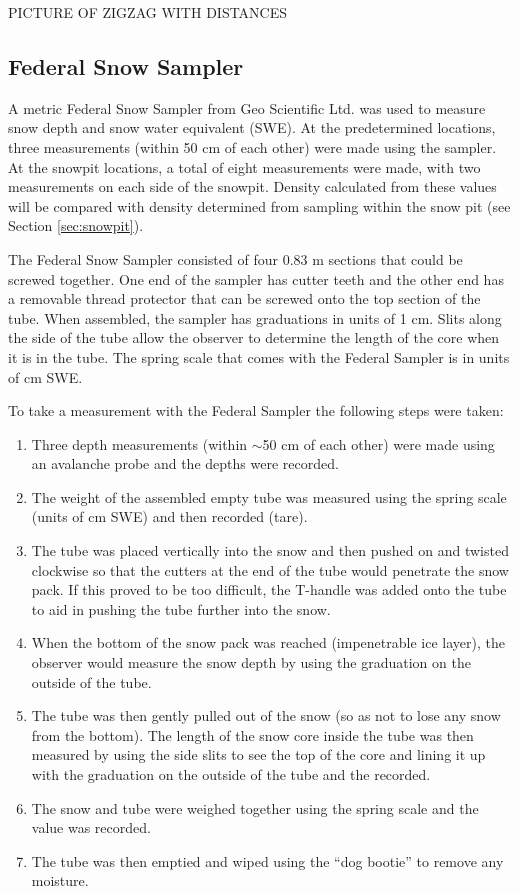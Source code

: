 \documentclass[12pt]{article}
\begin{document}
 PICTURE OF ZIGZAG WITH DISTANCES
 
 \subsection{Federal Snow Sampler}
\label{sec:SWE}
 
A metric Federal Snow Sampler from Geo Scientific Ltd. was used to measure snow depth and snow water equivalent (SWE). At the predetermined locations, three measurements (within 50 cm of each other) were made using the sampler. At the snowpit locations, a total of eight measurements were made, with two measurements on each side of the snowpit. Density calculated from these values will be compared with density determined from sampling within the snow pit (see Section \ref{sec:snowpit}). 

The Federal Snow Sampler consisted of four 0.83 m sections that could be screwed together. One end of the sampler has cutter teeth and the other end has a removable thread protector that can be screwed onto the top section of the tube. When assembled, the sampler has graduations in units of 1 cm. Slits along the side of the tube allow the observer to determine the length of the core when it is in the tube. The spring scale that comes with the Federal Sampler is in units of cm SWE.  

To take a measurement with the Federal Sampler the following steps were taken:
\begin{enumerate}
\item Three depth measurements (within $\sim$50 cm of each other) were made using an avalanche probe and the depths were recorded.
\item The weight of the assembled empty tube was measured using the spring scale (units of cm SWE) and then recorded (tare).
\item The tube was placed vertically into the snow and then pushed on and twisted clockwise so that the cutters at the end of the tube would penetrate the snow pack. If this proved to be too difficult, the T-handle was added onto the tube to aid in pushing the tube further into the snow. 
\item When the bottom of the snow pack was reached (impenetrable ice layer), the observer would measure the snow depth by using the graduation on the outside of the tube.
\item The tube was then gently pulled out of the snow (so as not to lose any snow from the bottom). The length of the snow core inside the tube was then measured by using the side slits to see the top of the core and lining it up with the graduation on the outside of the tube and the recorded. 
\item The snow and tube were weighed together using the spring scale and the value was recorded.
\item The tube was then emptied and wiped using the ``dog bootie'' to remove any moisture. 
\end{enumerate}
\end{document}
